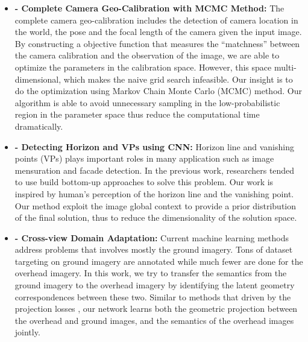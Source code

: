 \begin{itemize}[noitemsep]

  \item \textbf{ - 
  Complete Camera Geo-Calibration with MCMC Method:} \newline \newline
  The complete camera geo-calibration includes the detection of camera
  location in the world, the pose and the focal length of the camera
  given the input image. By constructing a objective function that
  measures the ``matchness'' between the camera calibration and the
  observation of the image, we are able to optimize the parameters in
  the calibration space. However, this space multi-dimensional, which
  makes the naive grid search infeasible. Our insight is to do the
  optimization using Markov Chain Monte Carlo (MCMC) method. Our
  algorithm is able to avoid unnecessary sampling in the
  low-probabilistic region in the parameter space thus reduce the
  computational time dramatically. \newline

  \item \textbf{ -
  Detecting Horizon and VPs using CNN:} \newline \newline
  Horizon line and vanishing points (VPs) plays important roles in many
  application such as image mensuration and facade detection. In the
  previous work, researchers tended to use build bottom-up approaches to
  solve this problem. Our work is inspired by human's perception of the
  horizon line and the vanishing point. Our method exploit the image
  global context to provide a prior distribution of the final solution,
  thus to reduce the dimensionality of the solution space. \newline

  \item \textbf{ -
  Cross-view Domain Adaptation:} \newline \newline
  Current machine learning methods address problems that involves mostly
  the ground imagery. Tons of dataset targeting on ground imagery are
  annotated while much fewer are done for the overhead imagery.
  In this work, we try to transfer the semantics from the ground imagery
  to the overhead imagery by identifying the latent geometry
  correspondences between these two. Similar to methods that driven by
  the projection losses , our network learns 
  both the geometric projection between the overhead and ground
  images, and the semantics of the overhead images jointly. \newline


\end{itemize}
